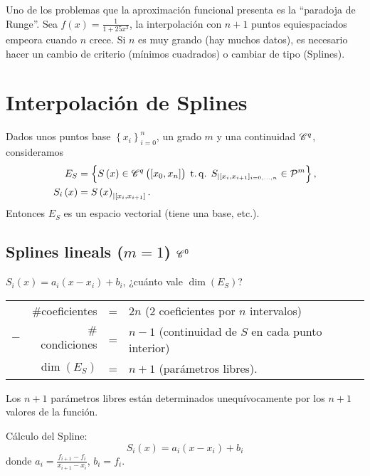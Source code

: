 \begin{obs}
    Uno de los problemas que la aproximaci\'on funcional presenta es la ``paradoja de Runge''. Sea $f\left( x \right) = \frac{1}{1+25x^2}$, la interpolaci\'on con $n+1$ puntos equiespaciados empeora cuando $n$ crece. Si $n$ es muy grando (hay muchos datos), es necesario hacer un cambio de criterio (m\'inimos cuadrados) o cambiar de tipo (Splines).
\end{obs}

\section{Interpolaci\'on de Splines}

\begin{prop}
    Dados unos puntos base $\left\{ x_i \right\}_{i=0}^n$, un grado $m$ y una continuidad $\mathscr{C}^q$, consideramos
    \begin{align*}
        E_{S} &= \left\{S\left( x \right) \in \mathscr{C}^q\left( \left[ x_0, x_n \right] \right) \operatorname{\;t.q.\;} S_{|[ x_i, x_{i+1} ]_{i=0,\dots,n}} \in \mathcal{P}^m\right\}, \\
        S_i\left( x \right) &= S\left( x \right)_{|[ x_i, x_{i+1} ]}.
    \end{align*}
    Entonces $E_S$ es un espacio vectorial (tiene una base, etc.).
\end{prop}

\subsection{Splines lineals ($m=1$) $\mathscr{C}^0$}

$S_i\left( x \right) = a_i\left( x-x_i \right) + b_i$, ¿cuánto vale $\dim\left( E_S \right)$?
\begin{center}
    \begin{tabular}{crcl}
        & $\#$coeficientes &=& $2n$ (2 coeficientes por $n$ intervalos)\\
        $-$ & $\#$condiciones &=& $n-1$ (continuidad de $S$ en cada punto interior)\\\hline
        &$\dim\left( E_S \right)$ &=& $n+1$ (parámetros libres).
    \end{tabular}
\end{center}

Los $n+1$ parámetros libres están determinados unequívocamente por los $n+1$ valores de la función.

Cálculo del Spline: 
\[
    S_i\left( x \right) = a_i\left( x-x_i \right) + b_i
\]
donde $a_i = \frac{f_{i+1}-f_i}{x_{i+1}-x_i}$, $b_i = f_i$.

